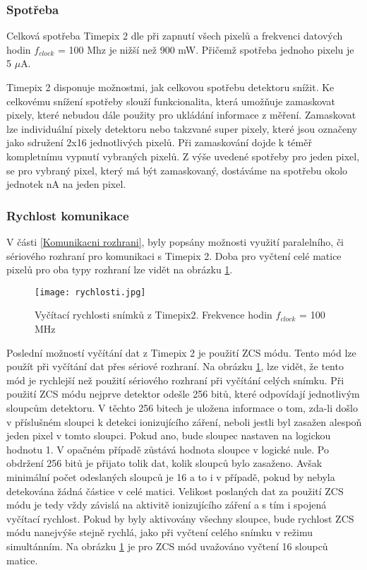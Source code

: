 \subsubsection{Spotřeba}	
Celková spotřeba Timepix 2 dle \cite{Timepix2} při zapnutí všech pixelů a frekvenci datových hodin $f_{clock}$ = 100 Mhz je nižší než 900 mW. Přičemž spotřeba jednoho pixelu je 5 $\mu$A.
\par Timepix 2 disponuje možnostmi, jak celkovou spotřebu detektoru snížit. Ke celkovému snížení spotřeby slouží funkcionalita, která umožňuje zamaskovat pixely, které nebudou dále použity pro ukládání informace z měření. Zamaskovat lze individuální pixely detektoru nebo takzvané super pixely, které jsou označeny jako sdružení 2x16 jednotlivých pixelů. Při zamaskování dojde k téměř kompletnímu vypnutí vybraných pixelů. Z výše uvedené spotřeby pro jeden pixel, se pro vybraný pixel, který má být zamaskovaný, dostáváme na spotřebu okolo jednotek nA na jeden pixel.

\subsubsection{Rychlost komunikace}
V části \ref{Komunikacni rozhrani}, byly popsány možnosti využití paralelního, či sériového rozhraní pro komunikaci s Timepix 2. Doba pro vyčtení celé matice pixelů pro oba typy rozhraní lze vidět na obrázku \ref{fig:rychlosti}. 
\begin{figure}[h!]
	\centering
	\captionsetup{justification=centering}
	\texttt{[image: rychlosti.jpg]}
	\caption{Vyčítací rychlosti snímků z Timepix2. Frekvence hodin $f_{clock}$ = 100 MHz \cite{Timepix2}} 
	\label{fig:rychlosti}
\end{figure}	

Poslední možností vyčítání dat z Timepix 2 je použití ZCS módu. Tento mód lze použít při vyčítání dat přes sériové rozhraní. Na obrázku \ref{fig:rychlosti}, lze vidět, že tento mód je rychlejší než použití sériového rozhraní při vyčítání celých snímku. Při použití ZCS módu nejprve detektor odešle 256 bitů, které odpovídají jednotlivým sloupcům detektoru. V těchto 256 bitech je uložena informace o tom, zda-li došlo v příslušném sloupci k detekci ionizujícího záření, neboli jestli byl zasažen alespoň jeden pixel v tomto sloupci. Pokud ano, bude sloupec nastaven na logickou hodnotu 1. V opačném případě zůstává hodnota sloupce v logické nule. Po obdržení 256 bitů je přijato tolik dat, kolik sloupců bylo zasaženo. Avšak minimální počet odeslaných sloupců je 16 a to i v případě, pokud by nebyla detekována žádná částice v celé matici. Velikost poslaných dat za použití ZCS módu je tedy vždy závislá na aktivitě ionizujícího záření a s tím i spojená vyčítací rychlost. Pokud by byly aktivovány všechny sloupce, bude rychlost ZCS módu nanejvýše stejně rychlá, jako při vyčtení celého snímku v režimu simultánním. Na obrázku \ref{fig:rychlosti} je pro ZCS mód uvažováno vyčtení 16 sloupců matice.


